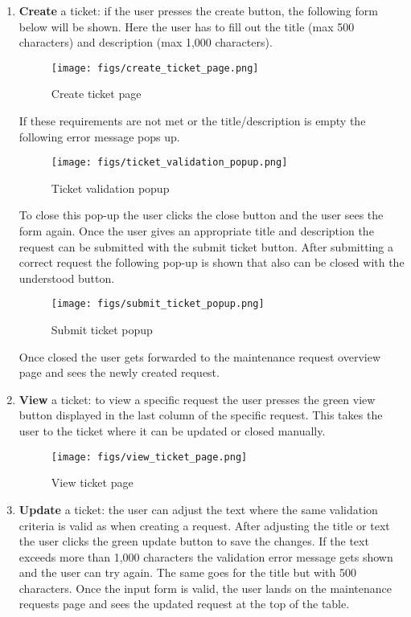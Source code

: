 \documentclass[conference]{IEEEtran}
\begin{document}
\begin{enumerate}
    \item \textbf{Create} a ticket: if the user presses the create button, the following form below will be shown. Here the user has to fill out the title (max 500 characters) and description (max 1,000 characters).
    \begin{figure}[H]
    \centering
    \texttt{[image: figs/create\_ticket\_page.png]}
    \caption{Create ticket page}
    \label{fig:Create ticket page}
    \end{figure}
    If these requirements are not met or the title/description is empty the following error message pops up.
    \begin{figure}[H]
    \centering
    \texttt{[image: figs/ticket\_validation\_popup.png]}
    \caption{Ticket validation popup}
    \label{fig:Ticket validation popup}
    \end{figure}
    To close this pop-up the user clicks the close button and the user sees the form again. Once the user gives an appropriate title and description the request can be submitted with the submit ticket button. After submitting a correct request the following pop-up is shown that also can be closed with the understood button.
    \begin{figure}[H]
    \centering
    \texttt{[image: figs/submit\_ticket\_popup.png]}
    \caption{Submit ticket popup}
    \label{fig:Submit ticket popup}
    \end{figure}
    Once closed the user gets forwarded to the maintenance request overview page and sees the newly created request.
    \item \textbf{View} a ticket: to view a specific request the user presses the green view button displayed in the last column of the specific request. This takes the user to the ticket where it can be updated or closed manually. 
    \begin{figure}[H]
    \centering
    \texttt{[image: figs/view\_ticket\_page.png]}
    \caption{View ticket page}
    \label{fig:View ticket page}
    \end{figure}
    \item \textbf{Update} a ticket: the user can adjust the text where the same validation criteria is valid as when creating a request. After adjusting the title or text the user clicks the green update button to save the changes. If the text exceeds more than 1,000 characters the validation error message gets shown and the user can try again. The same goes for the title but with 500 characters. Once the input form is valid, the user lands on the maintenance requests page and sees the updated request at the top of the table.

\end{enumerate}
\end{document}
